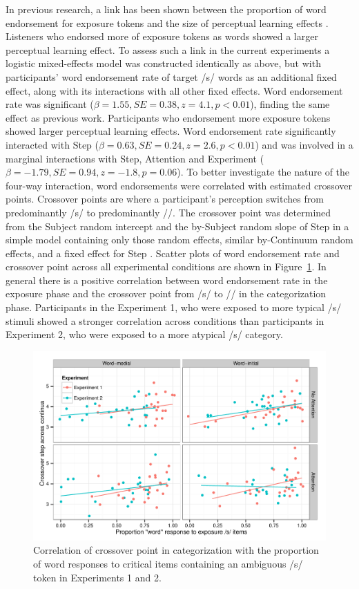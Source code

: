 In previous research, a link has been shown between the proportion of word endorsement for exposure tokens and the size of perceptual learning effects \citep{Scharenborg2013}.
Listeners who endorsed more of exposure tokens as words showed a larger perceptual learning effect.
To assess such a link in the current experiments a logistic mixed-effects model was constructed identically as above, but with participants' word endorsement rate of target /s/ words as an additional fixed effect, along with its interactions with all other fixed effects.
Word endorsement rate was significant ($\beta = 1.55, SE = 0.38, z = 4.1, p < 0.01$), finding the same effect as previous work.
Participants who endorsement more exposure tokens showed larger perceptual learning effects.
Word endorsement rate significantly interacted with Step ($\beta = 0.63, SE = 0.24, z = 2.6, p < 0.01$) and was involved in a marginal  interactions with Step, Attention and Experiment ($\beta = -1.79, SE = 0.94, z = -1.8, p = 0.06$).
To better investigate the nature of the four-way interaction, word endorsements were correlated with estimated crossover points.  
Crossover points are where a participant's perception switches from predominantly /s/ to predominantly /\textesh/.
The crossover point was determined from the Subject random intercept and the by-Subject random slope of Step in a simple model containing only those random effects, similar by-Continuum random effects, and a fixed effect for Step \citep{Kleber2012}. 
Scatter plots of word endorsement rate and crossover point across all experimental conditions are shown in Figure~\ref{fig:exp12xover}.
In general there is a positive correlation between word endorsement rate in the exposure phase and the crossover point from /s/ to /\textesh/ in the categorization phase.
Participants in the Experiment 1, who were exposed to more typical /s/ stimuli showed a stronger correlation across conditions than participants in Experiment 2, who were exposed to a more atypical /s/ category.

\begin{figure}[!ht]
\caption{Correlation of crossover point in categorization with the proportion of word responses to critical items containing an ambiguous /s/ token in Experiments 1 and 2.}\label{fig:exp12xover}
\begin{center}
\includegraphics[width=\textwidth]{graphs/exp12_xoverwordresp}
\end{center}
\end{figure} 

